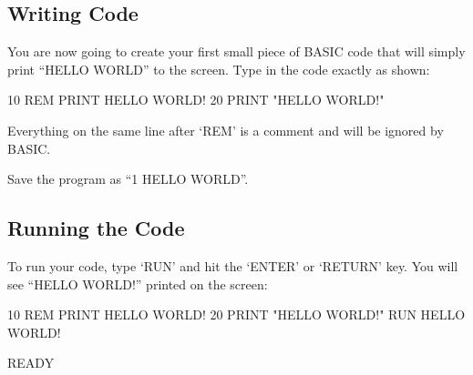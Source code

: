 \subsection*{Writing Code}

You are now going to create your first small piece of BASIC code that will simply print ``HELLO WORLD'' to the screen.  Type in the code exactly as shown:
\begin{basic}
10 REM PRINT HELLO WORLD!
20 PRINT "HELLO WORLD!"
\end{basic}

Everything on the same line after `REM' is a comment and will be ignored by BASIC.

Save the program as ``1 HELLO WORLD''.

\subsection*{Running the Code}

To run your code, type `RUN' and hit the `ENTER' or `RETURN' key.  You will see ``HELLO WORLD!'' printed on the screen:
\begin{code}
10 REM PRINT HELLO WORLD!
20 PRINT "HELLO WORLD!"
RUN
HELLO WORLD!

READY
\end{code}

